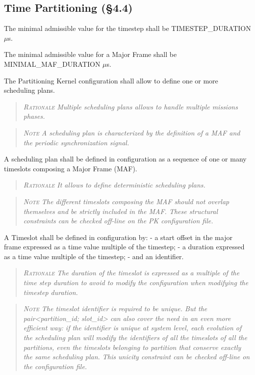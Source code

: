 \subsection{Time Partitioning (\S4.4)}

The minimal admissible value for the timestep shall be TIMESTEP\_DURATION $\mu$s.

The minimal admissible value for a Major Frame shall be MINIMAL\_MAF\_DURATION $\mu$s.

The Partitioning Kernel configuration shall allow to define one or more scheduling plans.
\begin{quote}\it
\textsc{Rationale}
Multiple scheduling plans allows to handle multiple missions phases.
\end{quote}
\begin{quote}\it
\textsc{Note}
A scheduling plan is characterized by the definition of a MAF and the periodic synchronization signal.
\end{quote}

A scheduling plan shall be defined in configuration as a sequence of one or many timeslots composing a Major Frame (MAF).
\begin{quote}\it
\textsc{Rationale}
It allows to define deterministic scheduling plans.
\end{quote}
\begin{quote}\it
\textsc{Note}
The different timeslots composing the MAF should not overlap themselves and be strictly included in the MAF. These structural constraints can be checked off-line on the PK configuration file.
\end{quote}

A Timeslot shall be defined in configuration by:
- a start offset in the major frame expressed as a time value multiple of the timestep;
- a duration expressed as a time value multiple of the timestep;
- and an identifier.
\begin{quote}\it
\textsc{Rationale}
The duration of the timeslot is expressed as a multiple of the time step duration to avoid to modify the configuration when modifying the timestep duration.
\end{quote}
\begin{quote}\it
\textsc{Note}
The timeslot identifier is required to be unique. But the pair<partition\_id; slot\_id> can also cover the need in an even more efficient way: if the identifier is unique at system level, each evolution of the scheduling plan will modify the identifiers of all the timeslots of all the partitions, even the timeslots belonging to partition that conserve exactly the same scheduling plan.
This unicity constraint can be checked off-line on the configuration file.
\end{quote}

